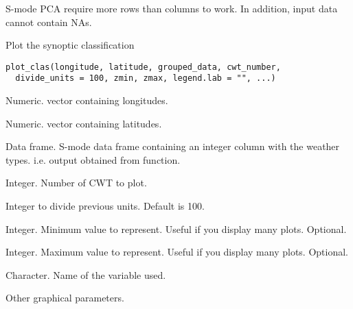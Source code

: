 \documentclass[a4paper]{book}
\begin{document}
%
\begin{Note}\relax
S-mode PCA require more rows than columns to work. In addition, input data cannot contain NAs.
\end{Note}
%
\begin{SeeAlso}\relax
{}
\end{SeeAlso}
%
\begin{Examples}
\end{Examples}
%
\begin{Description}\relax
Plot the synoptic classification
\end{Description}
%
\begin{Usage}
\begin{verbatim}
plot_clas(longitude, latitude, grouped_data, cwt_number,
  divide_units = 100, zmin, zmax, legend.lab = "", ...)
\end{verbatim}
\end{Usage}
%
\begin{Arguments}
\begin{ldescription}
\item[\code{longitude}] Numeric. vector containing longitudes.

\item[\code{latitude}] Numeric. vector containing latitudes.

\item[\code{grouped\_data}] Data frame. S-mode data frame containing an integer column with the weather types. i.e. output obtained from  function.

\item[\code{cwt\_number}] Integer. Number of CWT to plot.

\item[\code{divide\_units}] Integer to divide previous units. Default is 100.

\item[\code{zmin}] Integer. Minimum value to represent. Useful if you display many plots. Optional.

\item[\code{zmax}] Integer. Maximum value to represent. Useful if you display many plots. Optional.

\item[\code{legend.lab}] Character. Name of the variable used.

\item[\code{...}] Other graphical parameters.
\end{ldescription}
\end{Arguments}
\end{document}
